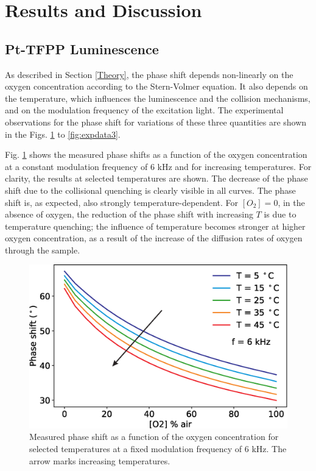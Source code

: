 \documentclass[sensors,article,submit,moreauthors,pdftex,10pt,a4paper]{Definitions/mdpi}
\begin{document}
\section{Results and Discussion}
\label{Results}

\subsection{Pt-TFPP Luminescence}

As described in Section \ref{Theory}, the phase shift depends non-linearly on the oxygen concentration according to the Stern-Volmer equation. It also depends on the temperature, which influences the luminescence and the collision mechanisms, and on the modulation frequency of the excitation light. The experimental observations for the phase shift for variations of these three quantities are shown in the Figs. \ref{fig:expdata1} to \ref{fig:expdata3}.

Fig. \ref{fig:expdata1} shows the measured phase shifts as a function of the oxygen concentration at a constant modulation frequency of 6 kHz and for increasing temperatures. For clarity, the results at selected temperatures are shown. The decrease of the phase shift due to the collisional quenching is clearly visible in all curves. The phase shift is, as expected, also strongly temperature-dependent. For $[O_2]=0$, in the absence of oxygen, the reduction of the phase shift with increasing $T$ is due to temperature quenching; the influence of temperature becomes stronger at higher oxygen concentration, as a result of the increase of the diffusion rates of oxygen through the sample.

\begin{figure}[htb]
\centering
\includegraphics[width=8.2 cm]{phase_O2_T.eps}
\caption{Measured phase shift as a function of the oxygen concentration for selected temperatures at a fixed modulation frequency of 6 kHz. The arrow marks increasing temperatures.}
\label{fig:expdata1}
\end{figure}
\end{document}

